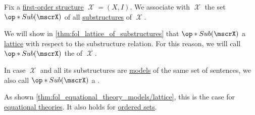 \begin{definition}\label{def:fol_lattice_of_substructures}
  Fix a \hyperref[def:fol_structure]{first-order structure} \( \mscrX = (X, I) \). We associate with \( \mscrX \) the set \( \op*{Sub}(\mscrX) \) of all \hyperref[def:fol_substructure]{substructures} of \( \mscrX \).

  We will show in \cref{thm:fol_lattice_of_substructures} that \( \op*{Sub}(\mscrX) \) a \hyperref[def:lattice]{lattice} with respect to the substructure relation. For this reason, we will call \( \op*{Sub}(\mscrX) \) the  of \( \mscrX \).

  \begin{thmenum}
     In case \( \mscrX \) and all its substructures are \hyperref[def:fol_semantics/model]{models} of the same set of sentences, we also call \( \op*{Sub}(\mscrX) \) a .

    As shown \cref{thm:fol_equational_theory_models/lattice}, this is the case for \hyperref[def:fol_equational_theory]{equational theories}. It also holds for \hyperref[def:preordered_set]{ordered sets}.
  \end{thmenum}
\end{definition}

